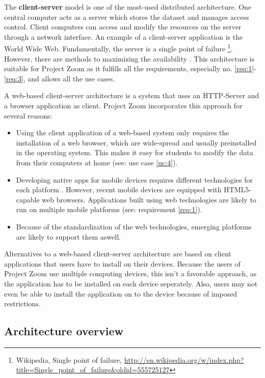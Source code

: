 The \textbf{client-server} \cite{Berson_1996} model is one of the most-used distributed architecture. One central computer acts as a server which stores the dataset and manages access control. Client computers can access and modify the resources on the server through a network interface. An example of a client-server application is the World Wide Web. Fundamentally, the server is a single point of failure \footnote{Wikipedia, Single point of failure, \url{http://en.wikipedia.org/w/index.php?title=Single_point_of_failure&oldid=555725127}}. However, there are methods to maximizing the availability \cite{Gray_1991} \cite{Colyer_2000}. This architecture is suitable for Project Zoom as it fulfills all the requirements, especially no. \ref{req:1}-\ref{req:3}, and allows all the use cases.

A web-based client-server architecture is a system that uses an HTTP-Server \cite{RFC2616} and a browser application as client. Project Zoom incorporates this approach for several reasons:
\begin{itemize}
\item Using the client application of a web-based system only requires the installation of a web browser, which are wide-spread and usually preinstalled in the operating system. This makes it easy for students to modify the data from their computers at home (see: use case \ref{uc:4}).
\item Developing native apps for mobile devices requires different technologies for each platform \cite{Charland_2011}. However, recent mobile devices are equipped with HTML5-capable \cite{W3C_HTML5} web browsers. Applications built using web technologies are likely to run on multiple mobile platforms (see: requirement \ref{req:1}).
\item Because of the standardization of the web technologies, emerging platforms are likely to support them aswell.
\end{itemize}

Alternatives to a web-based client-server architecture are based on client applications that users have to install on their devices. Because the users of Project Zoom use multiple computing devices, this isn't a favorable approach, as the application has to be installed on each device seperately. Also, users may not even be able to install the application on to the device because of imposed restrictions.

\subsection{Architecture overview}

